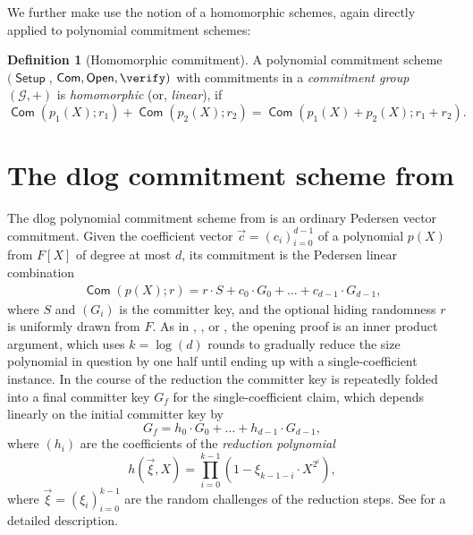 \documentclass[10pt,article,oneside]{memoir}
\theoremstyle{definition}
\newtheorem{defn}[thm]{Definition}
\theoremstyle{remark}
\DeclareMathOperator{\setup}{\mathsf{Setup}}
\DeclareMathOperator{\comm}{\mathsf{Com}}
\DeclareMathOperator{\open}{\mathsf{Open}}
\begin{document}
We further make use the notion of a homomorphic schemes, again directly applied to polynomial commitment schemes:
\begin{defn}[Homomorphic commitment]
A polynomial commitment scheme $(\setup$, $\comm,\open,\verify)$ with commitments in a \textit{commitment group} $(\mathcal G,+)$ is \textit{homomorphic} (or, \textit{linear}), if
\begin{equation*}
    \comm(p_1(X);r_1) + \comm(p_2(X);r_2) = \comm(p_1(X)+p_2(X);r_1+r_2).
\end{equation*}
\end{defn}


\section{The dlog commitment scheme from \cite{Buenz}}

The dlog polynomial commitment scheme from \cite{Buenz} is an ordinary Pedersen vector commitment. 
Given the coefficient vector $\vec c = (c_i)_{i=0}^{d-1}$ of a polynomial $p(X)$ from $F[X]$ of degree at most $d$, its commitment is the Pedersen linear combination
\begin{align*}
\comm(p(X);r) = r\cdot S + c_0\cdot G_0 + \ldots + c_{d-1}\cdot G_{d-1},
\end{align*}
where $S$ and $(G_i)$ is the committer key, and the optional hiding randomness $r$ is uniformly drawn from $F$.
As in \cite{BootleGroth}, \cite{Bulletproofs}, or \cite{Wahby}, 
the opening proof is an inner product argument, which uses $k=\log(d)$ rounds to gradually reduce the size polynomial in question by one half until ending up with a single-coefficient instance. 
In the course of the reduction the committer key is repeatedly folded into a final committer key $G_f$ for the single-coefficient claim, which depends linearly on the initial committer key by
\[
G_f = h_0\cdot G_0 + \ldots + h_{d-1}\cdot G_{d-1},
\]
where $(h_i)$ are the coefficients of the \textit{reduction polynomial} 
\begin{equation*}
h(\vec\xi, X) = \prod_{i=0}^{k-1} ( 1- \xi_{k-1-i} \cdot X^{2^i}),
\end{equation*}
where $\vec\xi=(\xi_i)_{i=0}^{k-1}$ are the random challenges of the reduction steps.
See \cite{Buenz} for a detailed description.
\end{document}
